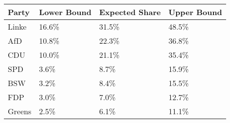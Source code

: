 \begin{tabular}{llll}
  \hline
Party & Lower Bound & Expected Share & Upper Bound \\ 
  \hline
Linke & 16.6\% & 31.5\% & 48.5\% \\ 
  AfD & 10.8\% & 22.3\% & 36.8\% \\ 
  CDU & 10.0\% & 21.1\% & 35.4\% \\ 
  SPD & 3.6\% & 8.7\% & 15.9\% \\ 
  BSW & 3.2\% & 8.4\% & 15.5\% \\ 
  FDP & 3.0\% & 7.0\% & 12.7\% \\ 
  Greens & 2.5\% & 6.1\% & 11.1\% \\ 
   \hline
\end{tabular}
